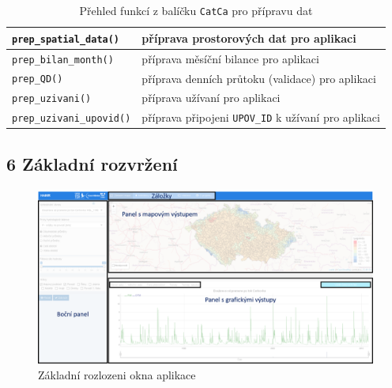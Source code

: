 \documentclass[12pt,]{article}
\begin{document}
\begin{table}[H]
\centering
\begin{tabular}{|l|l|}
\hline
\texttt{prep\_spatial\_data()}   & příprava prostorových dat pro aplikaci                     \\ \hline
\texttt{prep\_bilan\_month()}    & příprava měsíční bilance pro aplikaci                      \\ \hline
\texttt{prep\_QD()}             & příprava denních průtoku (validace) pro aplikaci  \\ \hline
\texttt{prep\_uzivani()}        & příprava užívaní pro aplikaci                              \\ \hline
\texttt{prep\_uzivani\_upovid()} & příprava připojeni \texttt{UPOV\_ID} k užívaní pro aplikaci \\ \hline
\end{tabular}
\caption{Přehled funkcí z balíčku \texttt{CatCa} pro přípravu dat}
\label{tab8}
\end{table}

\subsection{6 Základní rozvržení}\label{zakladni-rozvrzeni}

\begin{figure}[H]
      \includegraphics[width=\textwidth]{fig/rozlozeni2}
      \caption{Základní rozlozeni okna aplikace}
      \label{fig:ch5.2}
\end{figure}
\end{document}
